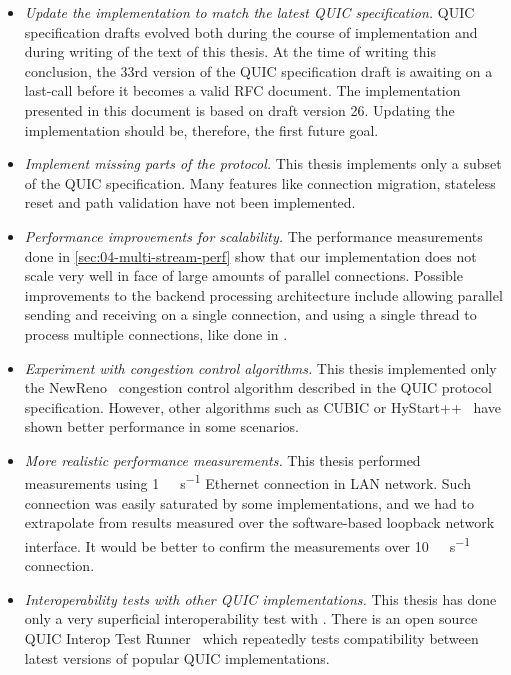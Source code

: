 \begin{itemize}

  \item \textit{Update the implementation to match the latest QUIC specification.} QUIC
        specification drafts evolved both during the course of implementation and during writing of
        the text of this thesis. At the time of writing this conclusion, the 33rd version of the
        QUIC specification draft is awaiting on a last-call before it becomes a valid RFC document.
        The implementation presented in this document is based on draft version 26. Updating the
        implementation should be, therefore, the first future goal.

  \item \textit{Implement missing parts of the protocol.} This thesis implements only a subset of
        the QUIC specification. Many features like connection migration, stateless reset and path
        validation have not been implemented.

  \item \textit{Performance improvements for scalability.} The performance measurements done in
        \autoref{sec:04-multi-stream-perf} show that our implementation does not scale very well in
        face of large amounts of parallel connections. Possible improvements to the backend
        processing architecture include allowing parallel sending and receiving on a single
        connection, and using a single thread to process multiple connections, like done in
        \libmsquic{}.

  \item \textit{Experiment with congestion control algorithms.} This thesis implemented only the
        NewReno~\autocite[Section~7]{draft-ietf-quic-recovery} congestion control algorithm described in
        the QUIC protocol specification. However, other algorithms such as CUBIC or
        HyStart++~\cite{cloudflareCubic} have shown better performance in some scenarios.

  \item \textit{More realistic performance measurements.} This thesis performed measurements using
        \SI[per-mode=symbol]{1}{\giga\bit\per\second} Ethernet connection in LAN network. Such
        connection was easily saturated by some implementations, and we had to extrapolate from
        results measured over the software-based loopback network interface. It would be better to
        confirm the measurements over \SI[per-mode=symbol]{10}{\giga\bit\per\second} connection.

  \item \textit{Interoperability tests with other QUIC implementations.} This thesis has done only a
        very superficial interoperability test with \libmsquic{}. There is an open source QUIC
        Interop Test Runner~\cite{QuicInteropRunner} which repeatedly tests compatibility between
        latest versions of popular QUIC implementations.

\end{itemize}
